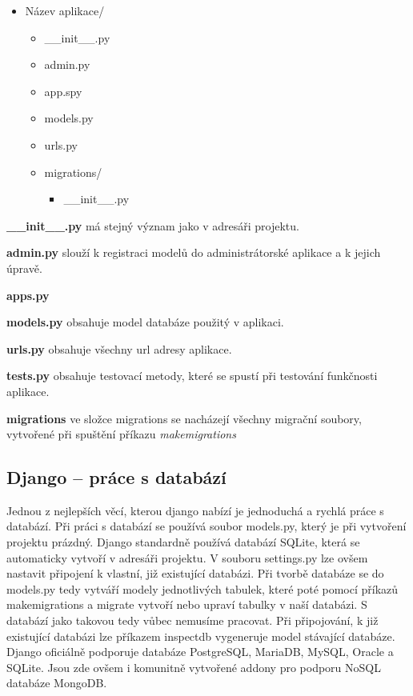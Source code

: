 \begin{itemize}
	\item \lbrack Název aplikace\rbrack /
 	\begin{itemize}
 		\item \_\_init\_\_.py
		\item admin.py
		\item app.spy
		\item models.py
		\item urls.py
		\item \lbrack migrations\rbrack /
		\begin{itemize}
			\item \_\_init\_\_.py
		\end{itemize}
	\end{itemize}
\end{itemize}

\vspace{9px}

\textbf{\_\_init\_\_.py} má stejný význam jako v adresáři projektu. 
\vspace{6px}

\textbf{admin.py} slouží k registraci modelů do administrátorské
aplikace a k jejich úpravě.  \vspace{6px}

\textbf{apps.py} 
\vspace{6px}

\textbf{models.py} obsahuje model databáze použitý v aplikaci.
\vspace{6px}

\textbf{urls.py} obsahuje všechny url adresy aplikace.
\vspace{6px}

\textbf{tests.py} obsahuje testovací metody, které se spustí při
testování funkčnosti aplikace.  \vspace{6px}

\textbf{migrations} ve složce migrations se nacházejí všechny migrační
soubory, vytvořené při spuštění příkazu \textit{makemigrations}

\newpage

\subsection{Django – práce s databází}

Jednou z nejlepších věcí, kterou django nabízí je jednoduchá a rychlá
práce s databází. Při práci s databází se používá soubor models.py,
který je při vytvoření projektu prázdný. Django standardně používá
databází SQLite, která se automaticky vytvoří v adresáři projektu. V
souboru settings.py lze ovšem nastavit připojení k vlastní, již
existující databázi. Při tvorbě databáze se do models.py tedy vytváří
modely jednotlivých tabulek, které poté pomocí příkazů makemigrations
a migrate vytvoří nebo upraví tabulky v naší databázi. S databází jako
takovou tedy vůbec nemusíme pracovat. Při připojování, k již
existující databázi lze příkazem inspectdb vygeneruje model stávající
databáze. Django oficiálně podporuje databáze PostgreSQL, MariaDB,
MySQL, Oracle a SQLite. Jsou zde ovšem i komunitně vytvořené addony
pro podporu NoSQL databáze MongoDB.

